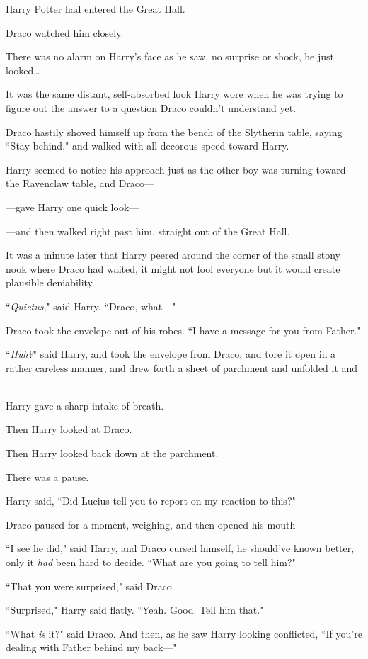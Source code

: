 Harry Potter had entered the Great Hall.

Draco watched him closely.

There was no alarm on Harry's face as he saw, no surprise or shock, he just looked{\ldots}

It was the same distant, self-absorbed look Harry wore when he was trying to figure out the answer to a question Draco couldn't understand yet.

Draco hastily shoved himself up from the bench of the Slytherin table, saying ``Stay behind," and walked with all decorous speed toward Harry.

Harry seemed to notice his approach just as the other boy was turning toward the Ravenclaw table, and Draco---

---gave Harry one quick look---

---and then walked right past him, straight out of the Great Hall.

It was a minute later that Harry peered around the corner of the small stony nook where Draco had waited, it might not fool everyone but it would create plausible deniability.

``\emph{Quietus}," said Harry. ``Draco, what---"

Draco took the envelope out of his robes. ``I have a message for you from Father."

``\emph{Huh?}" said Harry, and took the envelope from Draco, and tore it open in a rather careless manner, and drew forth a sheet of parchment and unfolded it and---

Harry gave a sharp intake of breath.

Then Harry looked at Draco.

Then Harry looked back down at the parchment.

There was a pause.

Harry said, ``Did Lucius tell you to report on my reaction to this?"

Draco paused for a moment, weighing, and then opened his mouth---

``I see he did," said Harry, and Draco cursed himself, he should've known better, only it \emph{had} been hard to decide. ``What are you going to tell him?"

``That you were surprised," said Draco.

``Surprised," Harry said flatly. ``Yeah. Good. Tell him that."

``What \emph{is} it?" said Draco. And then, as he saw Harry looking conflicted, ``If you're dealing with Father behind my back---"

